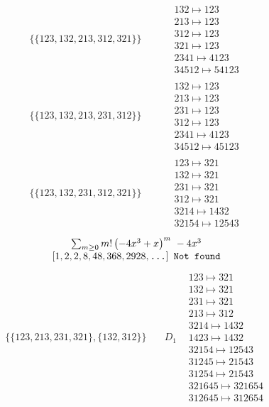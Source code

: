 \begin{tiny}
\begin{align}
\begin{matrix}
\end{matrix}
\\
\{\{123, 132, 213, 312, 321\}\}
\quad
&
\phantom{.}
&
\begin{matrix}
132 \mapsto 123\\213 \mapsto 123\\312 \mapsto 123\\321 \mapsto 123\\2341 \mapsto 4123\\34512 \mapsto 54123
\end{matrix}
\\
\{\{123, 132, 213, 231, 312\}\}
\quad
&
\phantom{.}
&
\begin{matrix}
132 \mapsto 123\\213 \mapsto 123\\231 \mapsto 123\\312 \mapsto 123\\2341 \mapsto 4123\\34512 \mapsto 45123
\end{matrix}
\\
\{\{123, 132, 231, 312, 321\}\}
\quad
&
\phantom{.}
&
\begin{matrix}
123 \mapsto 321\\132 \mapsto 321\\231 \mapsto 321\\312 \mapsto 321\\3214 \mapsto 1432\\32154 \mapsto 12543
\end{matrix}
\end{align}
$$
\begin{matrix}
\sum_{m \geq 0} m! \left(
-4 x^{3} + x
\right)^m
\ 
-4 x^{3}
\\
\left[1, 2, 2, 8, 48, 368, 2928, \text{\texttt{...}}\right]
\ 
\texttt{Not found}
\end{matrix}
$$
\vspace{-1em}
\begin{align}
\{\{123, 213, 231, 321\}, \{132, 312\}\}
\quad
&
D_1
&
\begin{matrix}
123 \mapsto 321\\132 \mapsto 321\\231 \mapsto 321\\213 \mapsto 312\\3214 \mapsto 1432\\1423 \mapsto 1432\\32154 \mapsto 12543\\31245 \mapsto 21543\\31254 \mapsto 21543\\321645 \mapsto 321654\\312645 \mapsto 312654

\end{matrix}
\end{align}
\end{tiny}
